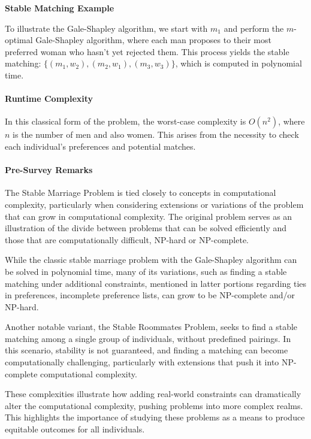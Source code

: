 \begin{center}
    \textbf{Stable Matching Example}
\end{center}

To illustrate the Gale-Shapley algorithm, we start with $m_1$ and perform the $m$-optimal Gale-Shapley algorithm, where each man proposes to their most preferred woman who hasn’t yet rejected them. This process yields the stable matching: \( \{(m_1, w_2), (m_2, w_1), (m_3, w_3)\} \), which is computed in polynomial time.

\paragraph{Runtime Complexity}
In this classical form of the problem, the worst-case complexity is $O(n^2)$, where $n$ is the number of men and also women. This arises from the necessity to check each individual's preferences and potential matches. \cite{gusfield}

\paragraph{Pre-Survey Remarks}
The Stable Marriage Problem is tied closely to concepts in computational complexity, particularly when considering extensions or variations of the problem that can grow in computational complexity. The original problem serves as an illustration of the divide between problems that can be solved efficiently and those that are computationally difficult, NP-hard or NP-complete. 

While the classic stable marriage problem with the Gale-Shapley algorithm can be solved in polynomial time, many of its variations, such as finding a stable matching under additional constraints, mentioned in latter portions regarding ties in preferences, incomplete preference lists, can grow to be NP-complete and/or NP-hard.

Another notable variant, the Stable Roommates Problem\cite{gusfield}, seeks to find a stable matching among a single group of individuals, without predefined pairings. In this scenario, stability is not guaranteed, and finding a matching can become computationally challenging, particularly with extensions that push it into NP-complete computational complexity.

These complexities illustrate how adding real-world constraints can dramatically alter the computational complexity, pushing problems into more complex realms. This highlights the importance of studying these problems as a means to produce equitable outcomes for all individuals. 

